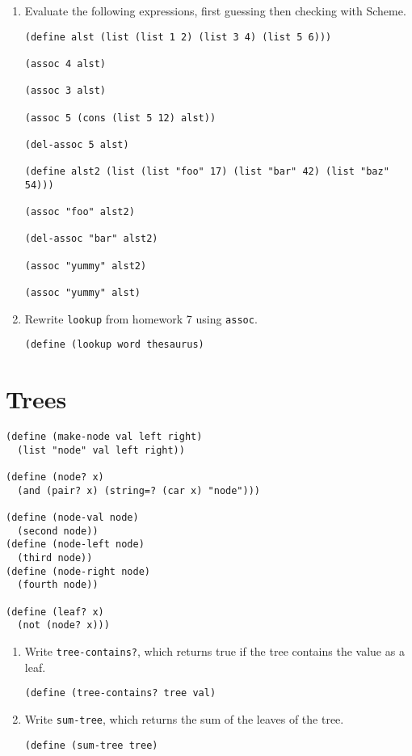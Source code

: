 \begin{enumerate}
\item Evaluate the following expressions, first guessing then checking
with Scheme.
\begin{verbatim}
(define alst (list (list 1 2) (list 3 4) (list 5 6)))

(assoc 4 alst)

(assoc 3 alst)

(assoc 5 (cons (list 5 12) alst))

(del-assoc 5 alst)

(define alst2 (list (list "foo" 17) (list "bar" 42) (list "baz" 54)))

(assoc "foo" alst2)

(del-assoc "bar" alst2)

(assoc "yummy" alst2)

(assoc "yummy" alst)
\end{verbatim}

\item Rewrite {\tt lookup} from homework 7 using {\tt assoc}.

\begin{verbatim}
(define (lookup word thesaurus)
\end{verbatim}
\vspace{1in}

\end{enumerate}


\section*{Trees}

\begin{verbatim}
(define (make-node val left right)
  (list "node" val left right))

(define (node? x)
  (and (pair? x) (string=? (car x) "node")))

(define (node-val node)
  (second node))
(define (node-left node)
  (third node))
(define (node-right node)
  (fourth node))

(define (leaf? x)
  (not (node? x)))
\end{verbatim}

\begin{enumerate}
\item Write {\tt tree-contains?}, which returns true if the tree contains the value as a leaf.
\begin{verbatim}
(define (tree-contains? tree val)
\end{verbatim}
\vspace{1in}

\item Write {\tt sum-tree}, which returns the sum of the leaves of the tree.
\begin{verbatim}
(define (sum-tree tree)
\end{verbatim}
\vspace{1in}

\end{enumerate}

